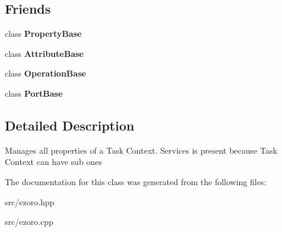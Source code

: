 \subsection*{Friends}
\begin{DoxyCompactItemize}
\item 
\hypertarget{classcoco_1_1_service_a5b941bc22175892390e39f2713561f54}{class {\bfseries Property\-Base}}\label{classcoco_1_1_service_a5b941bc22175892390e39f2713561f54}

\item 
\hypertarget{classcoco_1_1_service_a9a2db6fab4360da4f4662d33fab5c5f0}{class {\bfseries Attribute\-Base}}\label{classcoco_1_1_service_a9a2db6fab4360da4f4662d33fab5c5f0}

\item 
\hypertarget{classcoco_1_1_service_a0fd190fbc59c52d7087458074a7fc191}{class {\bfseries Operation\-Base}}\label{classcoco_1_1_service_a0fd190fbc59c52d7087458074a7fc191}

\item 
\hypertarget{classcoco_1_1_service_ad41531ff250556a868c747823db25142}{class {\bfseries Port\-Base}}\label{classcoco_1_1_service_ad41531ff250556a868c747823db25142}

\end{DoxyCompactItemize}


\subsection{Detailed Description}
Manages all properties of a Task Context. Services is present because Task Context can have sub ones 

The documentation for this class was generated from the following files\-:\begin{DoxyCompactItemize}
\item 
src/ezoro.\-hpp\item 
src/ezoro.\-cpp\end{DoxyCompactItemize}

